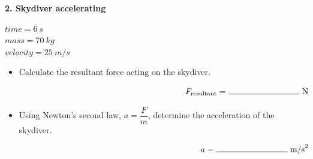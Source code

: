 \documentclass[12pt]{article}
\begin{document}
\noindent
\begin{minipage}[t]{0.48\textwidth}

\textbf{2. Skydiver accelerating}

\vspace{0.5cm}
$time = \SI{6}{s}$ \\
$mass = \SI{70}{kg}$ \\
$velocity = \SI{25}{m/s}$ \\

\vspace{0.5cm}

\begin{center}
\end{center}

\end{minipage}
\hfill
\begin{minipage}[t]{0.48\textwidth}

\begin{itemize}[label={}, leftmargin=*]
    \item Calculate the resultant force acting on the skydiver.

    \vspace{2.0cm}
    \[
    \makebox[\linewidth][r]{$F_{\text{resultant}} = \rule{3cm}{0.4pt}\ \text{N}$}
    \]

    \item Using Newton’s second law, $a = \dfrac{F}{m}$, determine the acceleration of the skydiver.

    \vspace{2.0cm}
    \[
    \makebox[\linewidth][r]{$a = \rule{3cm}{0.4pt}\ \text{m/s}^{2}$}
    \]
\end{itemize}

\end{minipage}

\vspace{1.2cm}
\end{document}
